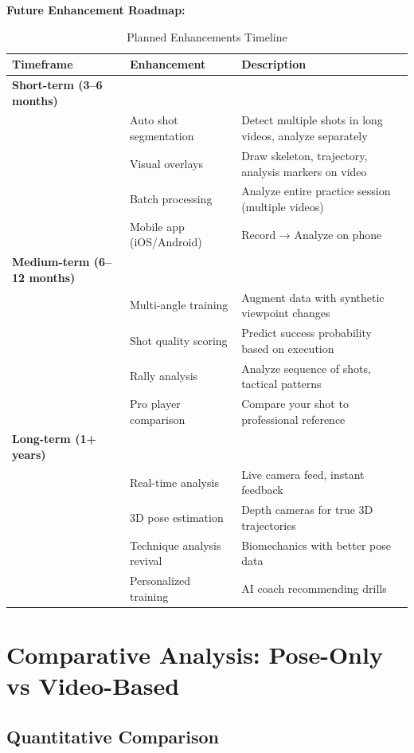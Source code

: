 \documentclass[11pt,a4paper]{article}
\begin{document}
\textbf{Future Enhancement Roadmap:}

\begin{table}[H]
\centering
\caption{Planned Enhancements Timeline}
\begin{tabular}{llp{6cm}}
\toprule
Timeframe & Enhancement & Description \\
\midrule
\textbf{Short-term (3--6 months)} & & \\
& Auto shot segmentation & Detect multiple shots in long videos, analyze separately \\
& Visual overlays & Draw skeleton, trajectory, analysis markers on video \\
& Batch processing & Analyze entire practice session (multiple videos) \\
& Mobile app (iOS/Android) & Record → Analyze on phone \\
\midrule
\textbf{Medium-term (6--12 months)} & & \\
& Multi-angle training & Augment data with synthetic viewpoint changes \\
& Shot quality scoring & Predict success probability based on execution \\
& Rally analysis & Analyze sequence of shots, tactical patterns \\
& Pro player comparison & Compare your shot to professional reference \\
\midrule
\textbf{Long-term (1+ years)} & & \\
& Real-time analysis & Live camera feed, instant feedback \\
& 3D pose estimation & Depth cameras for true 3D trajectories \\
& Technique analysis revival & Biomechanics with better pose data \\
& Personalized training & AI coach recommending drills \\
\bottomrule
\end{tabular}
\end{table}

\section{Comparative Analysis: Pose-Only vs Video-Based}

\subsection{Quantitative Comparison}
\end{document}

